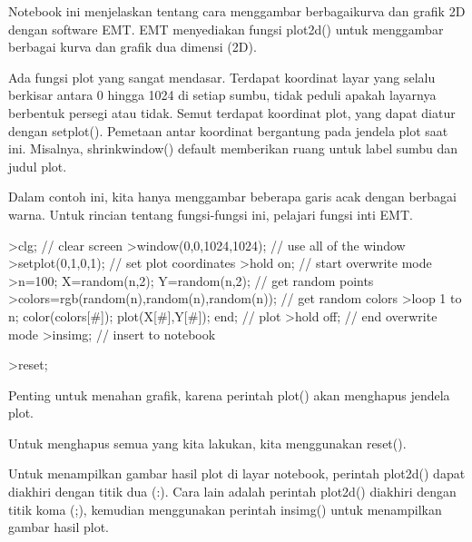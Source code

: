 \begin{eulernotebook}

    
\begin{eulercomment}
Notebook ini menjelaskan tentang cara menggambar berbagaikurva dan
grafik 2D dengan software EMT. EMT menyediakan fungsi plot2d() untuk
menggambar berbagai kurva dan grafik dua dimensi (2D).\\
\end{eulercomment}

\begin{eulercomment}
Ada fungsi plot yang sangat mendasar. Terdapat koordinat layar yang
selalu berkisar antara 0 hingga 1024 di setiap sumbu, tidak peduli
apakah layarnya berbentuk persegi atau tidak. Semut terdapat koordinat
plot, yang dapat diatur dengan setplot(). Pemetaan antar koordinat
bergantung pada jendela plot saat ini. Misalnya, shrinkwindow()
default memberikan ruang untuk label sumbu dan judul plot.

Dalam contoh ini, kita hanya menggambar beberapa garis acak dengan
berbagai warna. Untuk rincian tentang fungsi-fungsi ini, pelajari
fungsi inti EMT.
\end{eulercomment}
\begin{eulerprompt}
>clg; // clear screen
>window(0,0,1024,1024); // use all of the window
>setplot(0,1,0,1); // set plot coordinates
>hold on; // start overwrite mode
>n=100; X=random(n,2); Y=random(n,2);  // get random points
>colors=rgb(random(n),random(n),random(n)); // get random colors
>loop 1 to n; color(colors[#]); plot(X[#],Y[#]); end; // plot
>hold off; // end overwrite mode
>insimg; // insert to notebook
\end{eulerprompt}
\begin{eulerprompt}
>reset;
\end{eulerprompt}
\begin{eulercomment}
Penting untuk menahan grafik, karena perintah plot() akan menghapus
jendela plot.


Untuk menghapus semua yang kita lakukan, kita menggunakan reset().

Untuk menampilkan gambar hasil plot di layar notebook, perintah
plot2d() dapat diakhiri dengan titik dua (:). Cara lain adalah
perintah plot2d() diakhiri dengan titik koma (;), kemudian menggunakan
perintah insimg() untuk menampilkan gambar hasil plot.


\end{eulercomment}
\end{eulernotebook}
